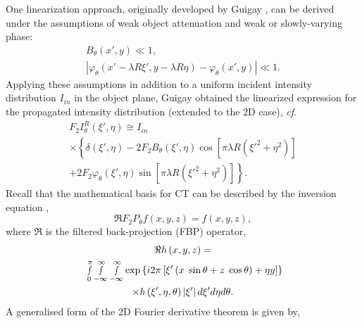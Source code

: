 \documentclass[twocolumn, switch]{article} %
\begin{document}
One linearization approach, originally developed by Guigay \cite{Guigay1977FourierHolograms}, can be derived under the assumptions of weak object attenuation and weak or slowly-varying phase:
\begin{equation}
    \label{eq3:weak_attenuation_phase}
    \begin{array}{l}
        {B_\theta }(x',y) \ll 1,\\
        \left| {{\varphi _\theta }(x' - \lambda R\xi ',y - \lambda R\eta ) - {\varphi _\theta }\left( {x',y} \right)} \right| \ll 1.
    \end{array}
\end{equation}
Applying these assumptions in addition to a uniform incident intensity distribution ${I_{in}}$ in the object plane, Guigay obtained the linearized expression for the propagated intensity distribution (extended to the 2D case), \textit{cf}. \cite{Guigay1977FourierHolograms}
\begin{multline}
    \label{eq3:intensity_r_ctf_weak}
    {F_2}I_\theta ^R \left( {\xi ',\eta } \right) \cong {I_{in}}\\
    \times \left\{ \delta \left( {\xi ',\eta } \right) - 2{F_2}{B_\theta }\left( {\xi ',\eta } \right)\cos \left[ {\pi \lambda R\left( {{{\xi '}^2} + {\eta ^2}} \right)} \right]\right.\\
    \left. + 2{F_2}{\varphi _\theta }\left( {\xi ',\eta } \right)\sin \left[ {\pi \lambda R\left( {{{\xi '}^2} + {\eta ^2}} \right)} \right]\right\}.
\end{multline}
Recall that the mathematical basis for CT can be described by the inversion equation \cite{Natterer2001TheTomography},
\begin{equation}
    \label{eq3:ct_operator}
    \Re {F_2}{P_\theta }f(x,y,z) = f(x,y,z),
\end{equation}
where $\Re $ is the filtered back-projection (FBP) operator,
\begin{multline}
    \label{eq3:fbp_operator}
    \Re h\left( {x,y,z} \right) = \\{\rm{\;}}\mathop \smallint \limits_0^\pi  \mathop \smallint \limits_{ - \infty }^\infty  \mathop \smallint \limits_{ - \infty }^\infty  \exp \left\{ {i2\pi \left[ {\xi '\left( {x{\rm{\;}}\sin \theta  + z{\rm{\;}}\cos \theta } \right) + \eta y} \right]} \right\} \\
    \times h\left( {\xi ',\eta ,\theta } \right)\left| {\xi '} \right|d\xi 'd\eta d\theta .
\end{multline}
A generalised form of the 2D Fourier derivative theorem \cite{Paganin2006CoherentOptics} is given by,
\end{document}
